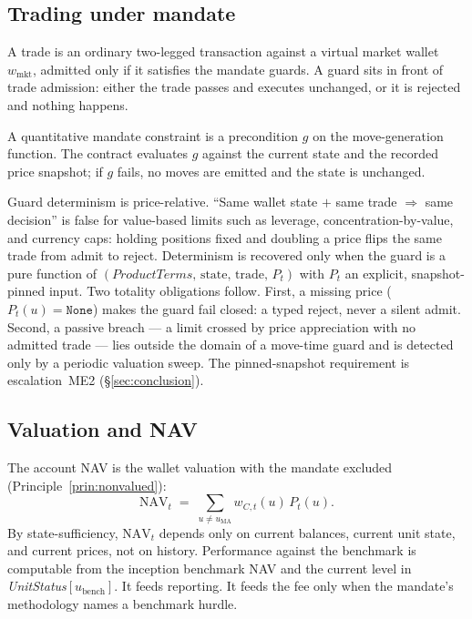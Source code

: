 \subsection{Trading under mandate}
\label{sec:managed-trading}

A trade is an ordinary two-legged transaction against a virtual market wallet $w_{\text{mkt}}$,
admitted only if it satisfies the mandate guards. A guard sits in front of trade admission:
either the trade passes and executes unchanged, or it is rejected and nothing happens.

\begin{definition}
A quantitative mandate constraint is a precondition $g$ on the move-generation function. The
contract evaluates $g$ against the current state and the recorded price snapshot; if $g$ fails, no
moves are emitted and the state is unchanged.
\end{definition}

Guard determinism is price-relative. ``Same wallet state $+$ same trade $\Rightarrow$ same
decision'' is false for value-based limits such as leverage, concentration-by-value, and
currency caps: holding positions fixed and doubling a price flips the same trade from admit
to reject. Determinism is recovered only when the guard is a pure function of
$(\textit{ProductTerms},\,\text{state},\,\text{trade},\,P_t)$ with $P_t$ an explicit,
snapshot-pinned input. Two totality obligations follow. First, a missing price
($P_t(u)=\texttt{None}$) makes the guard fail closed: a typed reject, never a silent admit.
Second, a passive breach --- a limit crossed by price appreciation with no admitted
trade --- lies outside the domain of a move-time guard and is detected only by a periodic
valuation sweep. The pinned-snapshot requirement is escalation~ME2
(\S\ref{sec:conclusion}).

\subsection{Valuation and NAV}
\label{sec:managed-nav}

The account NAV is the wallet valuation with the mandate excluded
(Principle~\ref{prin:nonvalued}):
\[
\mathrm{NAV}_t \;=\; \sum_{u\neq u_{\mathrm{MA}}} w_{C,t}(u)\,P_t(u).
\]
By state-sufficiency, $\mathrm{NAV}_t$ depends only on current balances, current unit state,
and current prices, not on history. Performance against the benchmark is computable from the
inception benchmark NAV and the current level in \textit{UnitStatus}$[u_{\mathrm{bench}}]$.
It feeds reporting. It feeds the fee only when the mandate's methodology names a benchmark
hurdle.

